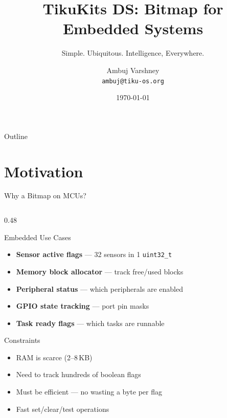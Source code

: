 \documentclass[aspectratio=169, 10pt]{beamer}
\title[TikuKits DS]{TikuKits DS: Bitmap for Embedded Systems}
\subtitle{Simple. Ubiquitous. Intelligence, Everywhere.}
\author[Ambuj Varshney]{Ambuj Varshney \\ \texttt{ambuj@tiku-os.org}}
\date{\today}
\begin{document}
\begin{frame}
\titlepage
\end{frame}

\begin{frame}{Outline}
\tableofcontents
\end{frame}

\section{Motivation}

\begin{frame}{Why a Bitmap on MCUs?}
\begin{columns}[T]
\begin{column}{0.48\textwidth}
\begin{block}{Embedded Use Cases}
\begin{itemize}
  \item \textbf{Sensor active flags} --- 32 sensors in 1 \texttt{uint32\_t}
  \item \textbf{Memory block allocator} --- track free/used blocks
  \item \textbf{Peripheral status} --- which peripherals are enabled
  \item \textbf{GPIO state tracking} --- port pin masks
  \item \textbf{Task ready flags} --- which tasks are runnable
\end{itemize}
\end{block}

\begin{block}{Constraints}
\begin{itemize}
  \item RAM is scarce (2--8\,KB)
  \item Need to track hundreds of boolean flags
  \item Must be efficient --- no wasting a byte per flag
  \item Fast set/clear/test operations
\end{itemize}
\end{block}
\end{column}


\end{columns}
\end{frame}
\end{document}

